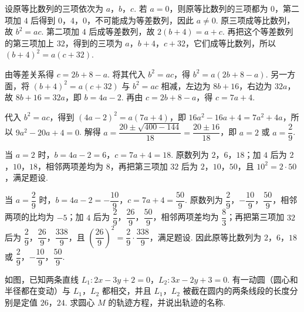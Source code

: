 \documentclass[UTF8,a4paper,oneside,11pt]{ctexbook}
\begin{document}
\begin{solution}
设原等比数列的三项依次为 \(a\)，\(b\)，\(c\). 若 \(a=0\)，则原等比数列的三项都为 \(0\)，第二项加 \(4\) 后得到 \(0\)，\(4\)，\(0\)，不可能成为等差数列，因此 \(a\ne0\). 原三项成等比数列，故 \(b^2=ac\). 第二项加 \(4\) 后成等差数列，故
\(2\left(b+4\right)=a+c\). 再把这个等差数列的第三项加上 \(32\)，得到的三项为 \(a\)，\(b+4\)，\(c+32\)，它们成等比数列，所以
\(\left(b+4\right)^2=a\left(c+32\right)\).

由等差关系得 \(c=2b+8-a\). 将其代入 \(b^2=ac\)，得
\(b^2=a\left(2b+8-a\right)\). 另一方面，将 \(\left(b+4\right)^2=a\left(c+32\right)\) 与 \(b^2=ac\) 相减，左边为 \(8b+16\)，右边为 \(32a\)，故
\(8b+16=32a\)，即 \(b=4a-2\). 再由 \(c=2b+8-a\)，得 \(c=7a+4\).

代入 \(b^2=ac\)，得到
\(\left(4a-2\right)^2=a\left(7a+4\right)\)，即
\(16a^2-16a+4=7a^2+4a\)，所以 \(9a^2-20a+4=0\). 解得
\(a=\dfrac{20\pm\sqrt{400-144}}{18}=\dfrac{20\pm16}{18}\)，即 \(a=2\) 或 \(a=\dfrac29\).

当 \(a=2\) 时，\(b=4a-2=6\)，\(c=7a+4=18\). 原数列为 \(2\)，\(6\)，\(18\)；加 \(4\) 后为 \(2\)，\(10\)，\(18\)，相邻两项差均为 \(8\)，再把第三项加 \(32\) 后为 \(2\)，\(10\)，\(50\)，且 \(10^2=2\cdot50\)，满足题设.

当 \(a=\dfrac29\) 时，\(b=4a-2=-\dfrac{10}{9}\)，\(c=7a+4=\dfrac{50}{9}\). 原数列为 \(\dfrac29\)，\(-\dfrac{10}{9}\)，\(\dfrac{50}{9}\)，相邻两项的比均为 \(-5\)；加 \(4\) 后为 \(\dfrac29\)，\(\dfrac{26}{9}\)，\(\dfrac{50}{9}\)，相邻两项差均为 \(\dfrac83\)；再把第三项加 \(32\) 后为 \(\dfrac29\)，\(\dfrac{26}{9}\)，\(\dfrac{338}{9}\)，且 \(\left(\dfrac{26}{9}\right)^2=\dfrac29\cdot\dfrac{338}{9}\)，满足题设. 因此原等比数列为 \(2\)，\(6\)，\(18\) 或 \(\dfrac29\)，\(-\dfrac{10}{9}\)，\(\dfrac{50}{9}\).
\end{solution}

\begin{problem}
如图，已知两条直线 \(L_{1}: 2x - 3y + 2 = 0\)，\(L_{2}: 3x - 2y + 3 = 0\). 有一动圆（圆心和半径都在变动）与 \(L_{1}\)，\(L_{2}\) 都相交，并且 \(L_{1}\)，\(L_{2}\) 被截在圆内的两条线段的长度分别是定值 \(26\)，\(24\). 求圆心 \(M\) 的轨迹方程，并说出轨迹的名称.
\begin{center}
\end{center}
\end{problem}
\end{document}
